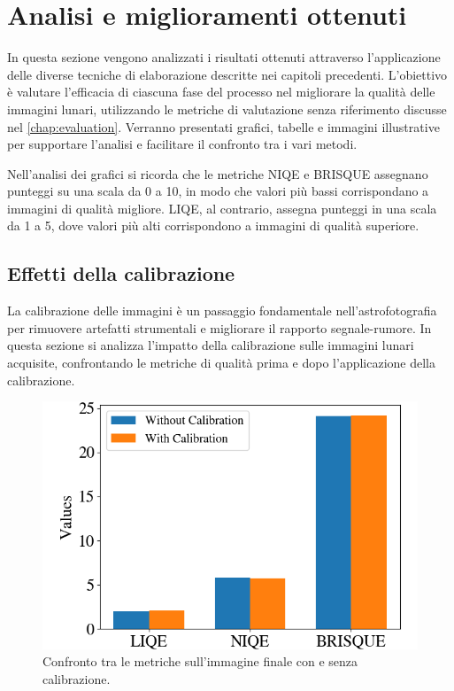 \section{Analisi e miglioramenti ottenuti} \label{sec:analysis}

In questa sezione vengono analizzati i risultati ottenuti attraverso l'applicazione delle diverse tecniche di elaborazione descritte nei capitoli precedenti. L'obiettivo è valutare l'efficacia di ciascuna fase del processo nel migliorare la qualità delle immagini lunari, utilizzando le metriche di valutazione senza riferimento discusse nel \cref{chap:evaluation}. Verranno presentati grafici, tabelle e immagini illustrative per supportare l'analisi e facilitare il confronto tra i vari metodi.

Nell'analisi dei grafici si ricorda che le metriche NIQE e BRISQUE assegnano punteggi su una scala da 0 a 10, in modo che valori più bassi corrispondano a immagini di qualità migliore. LIQE, al contrario, assegna punteggi in una scala da 1 a 5, dove valori più alti corrispondono a immagini di qualità superiore.

\subsection{Effetti della calibrazione} \label{subsec:analysis_cal}

La calibrazione delle immagini è un passaggio fondamentale nell'astrofotografia per rimuovere artefatti strumentali e migliorare il rapporto segnale-rumore. In questa sezione si analizza l'impatto della calibrazione sulle immagini lunari acquisite, confrontando le metriche di qualità prima e dopo l'applicazione della calibrazione.

\begin{figure}[H]
    \centering
    \includegraphics[scale = 0.475]{../assets/calibration_effect.png}
    \caption{Confronto tra le metriche sull'immagine finale con e senza calibrazione.}
    \label{fig:confronto-calibrazione}
\end{figure}

